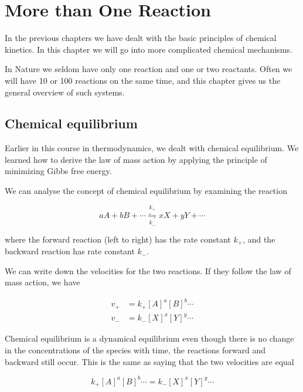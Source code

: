 \chapter{More than One Reaction}
\label{chap:complexReactions}

In the previous chapters we have dealt with the basic principles of chemical kinetics. In this chapter we will go into more complicated chemical mechanisms.

In Nature we seldom have only one reaction and one or two reactants. Often we will have 10 or 100 reactions on the same time, and this chapter gives us the general overview of such systems.

\section{Chemical equilibrium}
\label{sect:ChemEquilibrium}

Earlier in this course in thermodynamics, we dealt with chemical equilibrium. We learned how to derive the law of mass action by applying the principle of minimizing Gibbs free energy.

We can analyse the concept of chemical equilibrium by examining the reaction

\begin{equation}
    aA + bB + \cdots \overset{k_+}{\underset{k_-}{\leftrightharpoons}} xX + yY + \cdots
\end{equation}

where the forward reaction (left to right) has the rate constant $k_+$, and the backward reaction has rate constant $k_-$.

We can write down the velocities for the two reactions. If they follow the law of mass action, we have

\begin{subequations}
\begin{align}
    v_+ &= k_+ [A]^a[B]^b \cdots \\
    v_- &= k_- [X]^x[Y]^y \cdots
\end{align}
\end{subequations}

Chemical equilibrium is a dynamical equilibrium \ie even though there is no change in the concentrations of the species with time, the reactions forward and backward still occur. This is the same as saying that the two velocities are equal \ie

\begin{equation}
    k_+ [A]^a[B]^b \cdots = k_- [X]^x[Y]^y \cdots
\end{equation}

